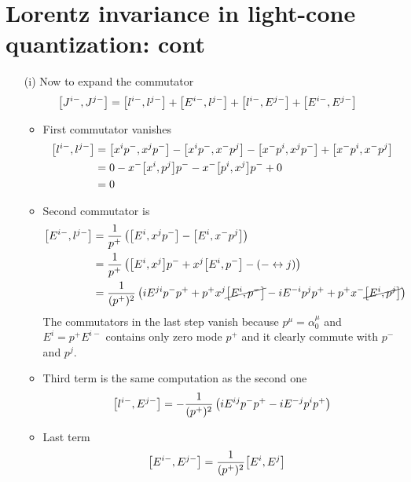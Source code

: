 \section{Lorentz invariance in light-cone quantization: cont}
\begin{enumerate}[label=(\alph*)]
	\item[(i)]
		Now to expand the commutator
		\begin{align*}
			\comm{J^{i-}}{J^{j-}} &= \comm{l^{i-}}{l^{j-}} + \comm{E^{i-}}{l^{j-}} + \comm{l^{i-}}{E^{j-}} + \comm{E^{i-}}{E^{j-}}
		\end{align*}
		\begin{itemize}
			\item First commutator vanishes
				\begin{align*}
					\comm{l^{i-}}{l^{j-}} &= \comm{x^i p^-}{x^j p^-} - \comm{x^i p^-}{x^- p^j} - \comm{x^- p^i}{x^j p^-} + \comm{x^- p^i}{x^-p^j} \\
												 &= 0 - x^- \comm{x^i}{p^j} p^- - x^- \comm{p^i}{x^j} p^- + 0  \\
												 &= 0
				\end{align*}
			\item Second commutator is
				\begin{align*}
					\comm{E^{i-}}{l^{j-}} &= \frac{1}{p^+} \left( \comm{E^i}{x^j p^-} - \comm{E^i}{x^- p^j} \right) \\
												 &= \frac{1}{p^+} \left( \comm{E^i}{x^j}p^- + x^j \comm{E^i}{p^-} - (- \leftrightarrow j) \right) \\
												 &= \frac{1}{(p^+)^2} \left( i E^{ji} p^- p^+ + p^+ x^j  \cancel{\comm{E^i}{p^-}} - i E^{-i} p^j p^+ + p^+x^- \cancel{\comm{E^i}{p^j}} \right)
				\end{align*}
				The commutators in the last step vanish because $p^\mu = \alpha^\mu_0$ and $E^i = p^+ E^{i-}$ contains only zero mode $p^+$ and it clearly commute with $p^{-}$ and $p^{j}$.
			\item Third term is the same computation as the second one
				\begin{equation*}
					\comm{l^{i-}}{E^{j-}} = - \frac{1}{(p^+)^2} \left( i E^{ij} p^- p^+ - i E^{-j} p^i p^+  \right)
				\end{equation*}
			\item Last term
				\begin{align*}
					\comm{E^{i-}}{E^{j-}} &= \frac{1}{(p^+)^2} \comm{E^i}{E^j}
				\end{align*}
		\end{itemize}

\end{enumerate}
